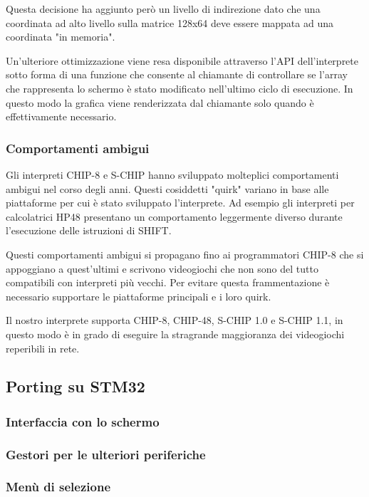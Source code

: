 \documentclass[a4paper]{article}
\begin{document}
Questa decisione ha aggiunto però un livello di indirezione dato
che una coordinata ad alto livello sulla matrice 128x64 deve essere
mappata ad una coordinata "in memoria".

Un'ulteriore ottimizzazione viene resa disponibile attraverso l'API
dell'interprete sotto forma di una funzione che consente al chiamante
di controllare se l'array che rappresenta lo schermo è stato
modificato nell'ultimo ciclo di esecuzione. In questo modo la grafica
viene renderizzata dal chiamante solo quando è effettivamente
necessario.

\subsubsection{Comportamenti ambigui}

Gli interpreti CHIP-8 e S-CHIP hanno sviluppato molteplici
comportamenti ambigui nel corso degli anni. Questi cosiddetti
"quirk" variano in base alle piattaforme per cui è stato sviluppato
l'interprete. Ad esempio gli interpreti per calcolatrici HP48
presentano un comportamento leggermente diverso durante l'esecuzione
delle istruzioni di SHIFT.

Questi comportamenti ambigui si propagano fino ai programmatori
CHIP-8 che si appoggiano a quest'ultimi e scrivono videogiochi che
non sono del tutto compatibili con interpreti più vecchi. Per evitare
questa frammentazione è necessario supportare le piattaforme
principali e i loro quirk.

Il nostro interprete supporta CHIP-8, CHIP-48, S-CHIP 1.0 e
S-CHIP 1.1, in questo modo è in grado di eseguire la stragrande
maggioranza dei videogiochi reperibili in rete.

\subsection{Porting su STM32}

\subsubsection{Interfaccia con lo schermo}

\subsubsection{Gestori per le ulteriori periferiche}

\subsubsection{Menù di selezione}
\end{document}
